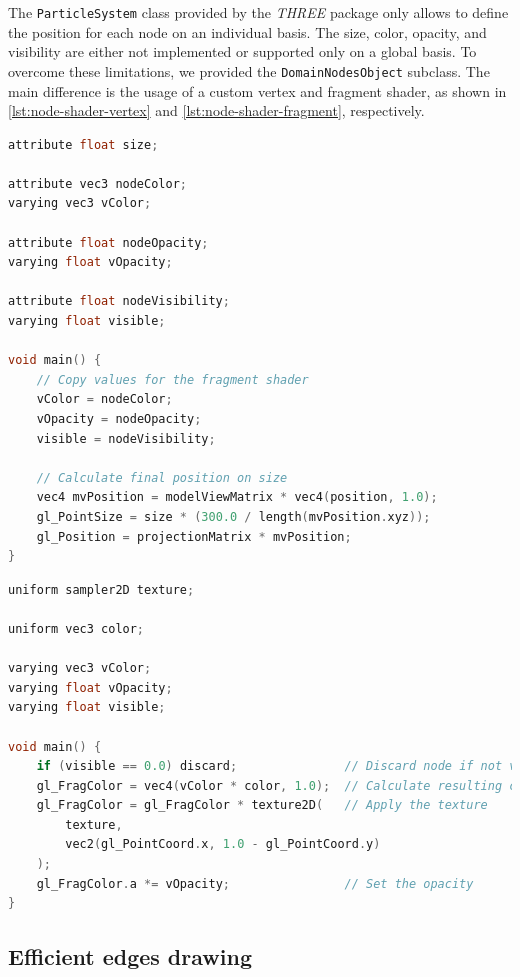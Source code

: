 The \texttt{ParticleSystem} class provided by the \emph{THREE} package only allows to define the position for each node on an individual basis. The size, color, opacity, and visibility are either not implemented or supported only on a global basis. To overcome these limitations, we provided the \texttt{DomainNodesObject} subclass. The main difference is the usage of a custom vertex and fragment shader, as shown in \vref{lst:node-shader-vertex} and \vref{lst:node-shader-fragment}, respectively.

\begin{lstlisting}[caption={Custom vertex shader for the \texttt{DomainNodesObject}.},label=lst:node-shader-vertex,language=c]
attribute float size;

attribute vec3 nodeColor;
varying vec3 vColor;

attribute float nodeOpacity;
varying float vOpacity;

attribute float nodeVisibility;
varying float visible;

void main() {
    // Copy values for the fragment shader
    vColor = nodeColor;
    vOpacity = nodeOpacity;
    visible = nodeVisibility;

    // Calculate final position on size
    vec4 mvPosition = modelViewMatrix * vec4(position, 1.0);
    gl_PointSize = size * (300.0 / length(mvPosition.xyz));
    gl_Position = projectionMatrix * mvPosition;
}
\end{lstlisting}

\begin{lstlisting}[caption={Custom fragment shader for the \texttt{DomainNodesObject}.},label=lst:node-shader-fragment,language=c]
uniform sampler2D texture;

uniform vec3 color;

varying vec3 vColor;
varying float vOpacity;
varying float visible;

void main() {
    if (visible == 0.0) discard;               // Discard node if not visible
    gl_FragColor = vec4(vColor * color, 1.0);  // Calculate resulting color
    gl_FragColor = gl_FragColor * texture2D(   // Apply the texture
        texture,
        vec2(gl_PointCoord.x, 1.0 - gl_PointCoord.y)
    );
    gl_FragColor.a *= vOpacity;                // Set the opacity
}
\end{lstlisting}


\subsection{Efficient edges drawing}

